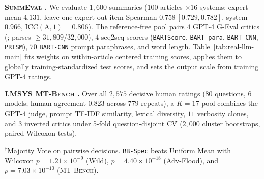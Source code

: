 \textbf{\textsc{SummEval} \citep{fabbri2021summeval}.} We evaluate $1,600$ summaries ($100$ articles $\times 16$ systems; expert mean $4.131$, leave-one-expert-out item Spearman $0.758\,[0.729, 0.782]$, system $0.966$, $\mathrm{ICC(A,1)} = 0.806$). The reference-free pool pairs $4$ GPT-4 G-Eval critics (\citealp{liu2023geval}; parses $\ge 31{,}809/32{,}000$), $4$ seq2seq scorers (\texttt{BARTScore}, \texttt{BART-para}, \texttt{BART-CNN}, \texttt{PRISM}), $70$ \texttt{BART-CNN} prompt paraphrases, and word length. Table~\ref{tab:real-llm-main} fits weights on within-article centered training scores, applies them to globally training-standardized test scores, and sets the output scale from training GPT-4 ratings.

\textbf{\textsc{LMSYS MT-Bench} \citep{zheng2023judging}.} Over all $2,575$ decisive human ratings ($80$ questions, $6$ models; human agreement $0.823$ across $779$ repeats), a $K=17$ pool combines the GPT-4 judge, prompt TF-IDF similarity, lexical diversity, $11$ verbosity clones, and $3$ inverted critics under 5-fold question-disjoint CV ($2,000$ cluster bootstraps, paired Wilcoxon tests).

\begin{table}[t]
\centering
\caption{\textbf{Held-out 5-fold real-LLM evaluation} on \textsc{SummEval}
($100$ articles, $1,600$ items) and \textsc{MT-Bench} ($80$ questions, $2,575$
decisive human ratings); $95\%$ cluster-bootstrap intervals.}
\label{tab:real-llm-main}
\vspace{2pt}
{\footnotesize $^\dagger$Majority Vote on pairwise decisions. \texttt{RB-Spec} beats Uniform Mean with Wilcoxon $p=1.21\times 10^{-9}$ (Wild), $p=4.40\times 10^{-18}$ (Adv-Flood), and $p=7.03\times 10^{-10}$ (\textsc{MT-Bench}).}
\vspace{-6pt}
\end{table}

